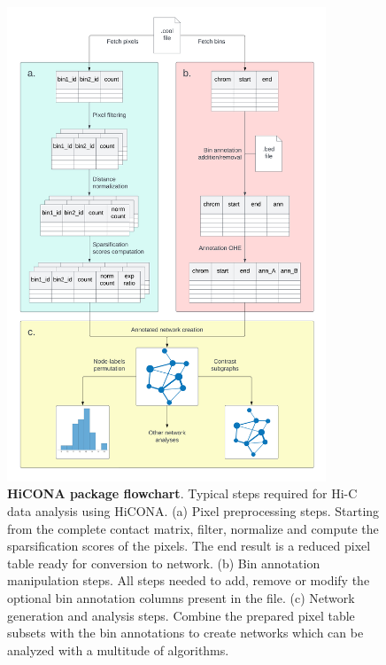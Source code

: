 \begin{figure}
  \centering
  \includegraphics[width=0.85\textwidth]{package_flowchart.png}
  \caption{\textbf{HiCONA package flowchart}. Typical steps required for Hi-C data analysis using HiCONA. (a) Pixel preprocessing steps. Starting from the complete contact matrix, filter, normalize and compute the sparsification scores of the pixels. The end result is a reduced pixel table ready for conversion to network. (b) Bin annotation manipulation steps. All steps needed to add, remove or modify the optional bin annotation columns present in the file. (c) Network generation and analysis steps. Combine the prepared pixel table subsets with the bin annotations to create networks which can be analyzed with a multitude of algorithms.}
  \label{fig:flowchart}
\end{figure}

